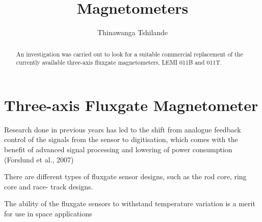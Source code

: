 \documentclass[a4paper,10pt]{report}
\title{Magnetometers}
\author{Thinawanga Tshilande}
\begin{document}
\maketitle

\begin{abstract}
An investigation was carried out to look for a suitable commercial replacement of the
currently available three-axis fluxgate magnetometers, LEMI 011B and 011T. 
\end{abstract}
\section{Three-axis Fluxgate Magnetometer}
Research done in previous years has led
to the shift from analogue feedback control of the signals from the sensor to
digitisation, which comes with the benefit of advanced signal processing and lowering
of power consumption
(Forslund et al., 2007)\par
There are different types of fluxgate sensor designs, such as the rod core, ring core
and race-
track designs.\par
The ability of the fluxgate
sensors to withstand temperature variation is a merit for use in space applications
\end{document}
